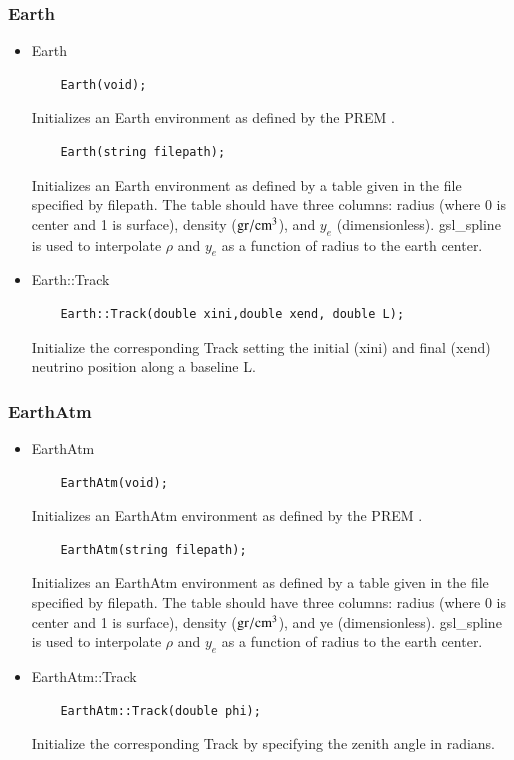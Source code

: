 \documentclass[3p,12pt,authoryear]{elsarticle}
\newcommand{\ttf}{\ttfamily}
\begin{document}
\subsubsection{{\ttf Earth}}

\begin{itemize}
\item {\ttf Earth}
  \begin{lstlisting}
    Earth(void);
  \end{lstlisting}
  Initializes an {\ttf Earth} environment as defined by the PREM \citep{dziewonski1981preliminary}.
  \begin{lstlisting}
    Earth(string filepath);
  \end{lstlisting}
  Initializes an {\ttf Earth} environment as defined by a table given in the file specified by {\ttf filepath}. The table should have three columns: radius (where 0 is center and 1 is surface), density (${\rm gr}/{\rm cm}^3$), and $y_e$ (dimensionless). {\ttfamily gsl\_spline} \citep{gough2009gnu} is used to interpolate $\rho$ and $y_e$ as a function of radius to the earth center.
  \item {\ttf Earth::Track}
  \begin{lstlisting}
    Earth::Track(double xini,double xend, double L);
  \end{lstlisting}
  Initialize the corresponding {\ttf Track} setting the initial ({\ttf xini}) and final ({\ttf xend}) neutrino position along a baseline {\ttf L}.
\end{itemize}

\subsubsection{{\ttf EarthAtm}}

\begin{itemize}
\item {\ttf EarthAtm}
  \begin{lstlisting}
    EarthAtm(void);
  \end{lstlisting}
  Initializes an {\ttf EarthAtm} environment as defined by the PREM \citep{dziewonski1981preliminary}.
  \begin{lstlisting}
    EarthAtm(string filepath);
  \end{lstlisting}
  Initializes an {\ttf EarthAtm} environment as defined by a table given in the file specified by {\ttf filepath}. The table should have three columns: radius (where 0 is center and 1 is surface), density (${\rm gr}/{\rm cm}^3$), and ye (dimensionless). {\ttfamily gsl\_spline} \citep{gough2009gnu} is used to interpolate $\rho$ and $y_e$ as a function of radius to the earth center.
  \item {\ttf EarthAtm::Track}
  \begin{lstlisting}
    EarthAtm::Track(double phi);
  \end{lstlisting}
  Initialize the corresponding {\ttf Track} by specifying the zenith angle in radians.
\end{itemize}
\end{document}
